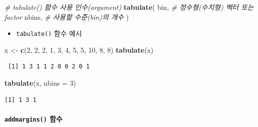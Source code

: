 \documentclass[
  11pt,
]{krantz}
\newenvironment{Shaded}{\begin{snugshade}}{\end{snugshade}}
\newcommand{\CommentTok}[1]{\textcolor[rgb]{0.37,0.37,0.37}{\textit{#1}}}
\newcommand{\DataTypeTok}[1]{\textcolor[rgb]{0.27,0.27,0.27}{#1}}
\newcommand{\DecValTok}[1]{\textcolor[rgb]{0.06,0.06,0.06}{#1}}
\newcommand{\KeywordTok}[1]{\textcolor[rgb]{0.27,0.27,0.27}{\textbf{#1}}}
\newcommand{\NormalTok}[1]{#1}
\newcommand{\StringTok}[1]{\textcolor[rgb]{0.5,0.5,0.5}{#1}}
\providecommand{\tightlist}{%
  \setlength{\itemsep}{0pt}\setlength{\parskip}{0pt}}
\begin{document}
\footnotesize

\begin{Shaded}
\begin{Highlighting}[]
\CommentTok{# tabulate() 함수 사용 인수(argument)}
\KeywordTok{tabulate}\NormalTok{(}
\NormalTok{  bin,  }\CommentTok{# 정수형(수치형) 벡터 또는 factor }
\NormalTok{  nbins, }\CommentTok{# 사용할 수준(bin)의 개수 }
\NormalTok{)}
\end{Highlighting}
\end{Shaded}

\normalsize

\begin{itemize}
\tightlist
\item
  \texttt{tabulate()} 함수 예시
\end{itemize}

\footnotesize

\begin{Shaded}
\begin{Highlighting}[]
\NormalTok{x <-}\StringTok{ }\KeywordTok{c}\NormalTok{(}\DecValTok{2}\NormalTok{, }\DecValTok{2}\NormalTok{, }\DecValTok{2}\NormalTok{, }\DecValTok{1}\NormalTok{, }\DecValTok{3}\NormalTok{, }\DecValTok{4}\NormalTok{, }\DecValTok{5}\NormalTok{, }\DecValTok{5}\NormalTok{, }\DecValTok{10}\NormalTok{, }\DecValTok{8}\NormalTok{, }\DecValTok{8}\NormalTok{)}
\KeywordTok{tabulate}\NormalTok{(x)}
\end{Highlighting}
\end{Shaded}

\begin{verbatim}
 [1] 1 3 1 1 2 0 0 2 0 1
\end{verbatim}

\begin{Shaded}
\begin{Highlighting}[]
\KeywordTok{tabulate}\NormalTok{(x, }\DataTypeTok{nbins =} \DecValTok{3}\NormalTok{)}
\end{Highlighting}
\end{Shaded}

\begin{verbatim}
[1] 1 3 1
\end{verbatim}

\normalsize

\hypertarget{tab-fun2}{%
\paragraph{\texorpdfstring{\texttt{addmargins()} 함수}{addmargins() 함수}}\label{tab-fun2}}
\end{document}
